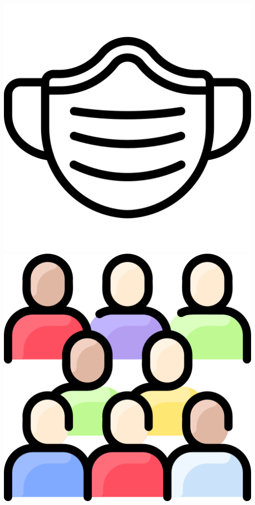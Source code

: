 \documentclass{beamer}
\begin{document}
\begin{CJK*}{UTF8}{bsmi}
\begin{frame}
\begin{columns}
\begin{column}{0.30\textwidth}
                \includegraphics[width=\textwidth, height=0.3\textheight]{mask.png}\\
                \includegraphics[height=0.3\textheight]{people.png}
            \end{column}
        \end{columns}
    \end{frame}


\end{CJK*}
\end{document}
